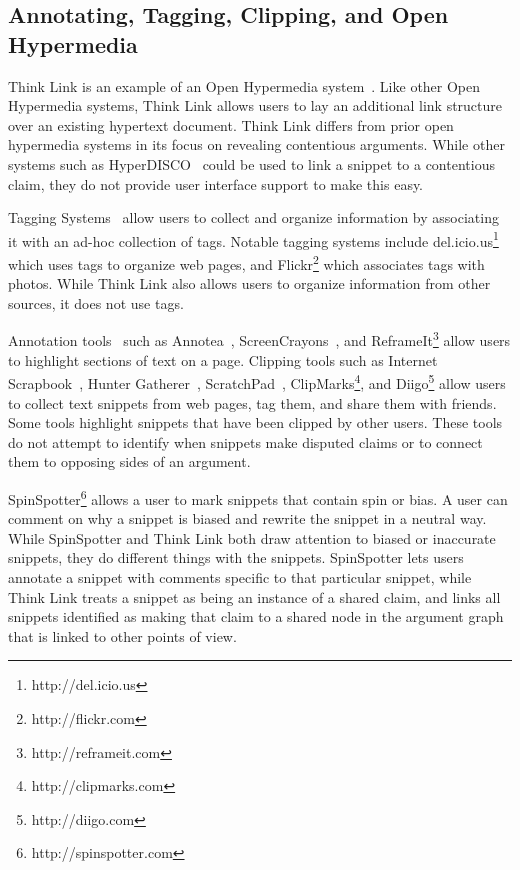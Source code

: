 \documentclass{chi2009}
\newcommand{\todo}[1]{}
\begin{document}
\subsection{Annotating, Tagging, Clipping, and Open Hypermedia}

Think Link is an example of an Open Hypermedia system~\cite{Bouvin2000}. Like other Open Hypermedia systems, Think Link allows users to lay an additional link structure over an existing hypertext document. Think Link differs from prior open hypermedia systems in its focus on revealing contentious arguments. While other systems such as HyperDISCO~\cite{Wiil1996} could be used to link a snippet to a contentious claim, they do not provide user interface support to make this easy.

\todo{Say how different from other Open Hypermedia link annotation systems}

Tagging Systems~\cite{Marlow2006,Golder2006} allow users to collect and organize information by associating it with an ad-hoc collection of tags. Notable tagging systems include del.icio.us\footnote{http://del.icio.us} which uses tags to organize web pages, and Flickr\footnote{http://flickr.com} which associates tags with photos. While Think Link also allows users to organize information from other sources, it does not use tags.

Annotation tools~\cite{Marshall1998} such as Annotea~\cite{Koivunen2001}, ScreenCrayons~\cite{Olsen2004}, and ReframeIt\footnote{http://reframeit.com} allow users to highlight sections of text on a page. Clipping tools such as Internet Scrapbook~\cite{Sugiura1998}, Hunter Gatherer~\cite{Schraefel2002}, ScratchPad~\cite{Gotz2007}, ClipMarks\footnote{http://clipmarks.com}, and Diigo\footnote{http://diigo.com} allow users to collect text snippets from web pages, tag them, and share them with friends. Some tools highlight snippets that have been clipped by other users. These tools do not attempt to identify when snippets make disputed claims or to connect them to opposing sides of an argument.

SpinSpotter\footnote{http://spinspotter.com} allows a user to mark snippets that contain spin or bias. A user can comment on why a snippet is biased and rewrite the snippet in a neutral way. While SpinSpotter and Think Link both draw attention to biased or inaccurate snippets, they do different things with the snippets. SpinSpotter lets users annotate a snippet with comments specific to that particular snippet, while Think Link treats a snippet as being an instance of a shared claim, and links all snippets identified as making that claim to a shared node in the argument graph that is linked to other points of view.
\end{document}
